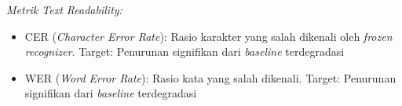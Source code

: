 \documentclass[12pt,a4paper]{book}
\begin{document}
\textit{Metrik Text Readability:}
\begin{itemize}[leftmargin=*, nosep]
\item CER (\textit{Character Error Rate}): Rasio karakter yang salah dikenali oleh \textit{frozen recognizer}. Target: Penurunan signifikan dari \textit{baseline} terdegradasi
\item WER (\textit{Word Error Rate}): Rasio kata yang salah dikenali. Target: Penurunan signifikan dari \textit{baseline} terdegradasi
\end{itemize}

\end{document}
